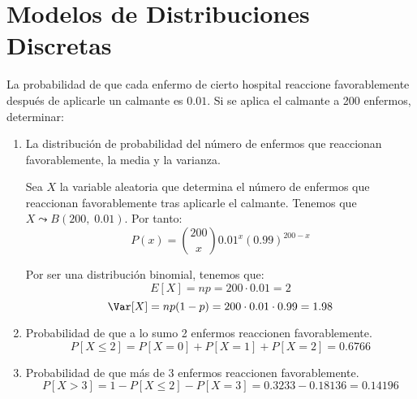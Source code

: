 \section{Modelos de Distribuciones Discretas}



\begin{ejercicio}
    La probabilidad de que cada enfermo de cierto hospital reaccione favorablemente después de aplicarle un calmante es $0.01$. Si se aplica el calmante a 200 enfermos, determinar:
    \begin{enumerate}
        \item La distribución de probabilidad del número de enfermos que reaccionan favorablemente, la media y la varianza.

        Sea $X$ la variable aleatoria que determina el número de enfermos que reaccionan favorablemente tras aplicarle el calmante. Tenemos que $X\leadsto B(200,\;0.01)$. Por tanto:
        \begin{equation*}
            P(x)=\binom{200}{x} 0.01^x (0.99)^{200-x}
        \end{equation*}

        Por ser una distribución binomial, tenemos que:
        \begin{equation*}
            E[X]=np = 200\cdot 0.01=2
        \end{equation*}
        \begin{equation*}
            \Var[X]=np(1-p) = 200\cdot 0.01\cdot 0.99=1.98
        \end{equation*}
        
        \item Probabilidad de que a lo sumo 2 enfermos reaccionen favorablemente.
        \begin{equation*}
            P[X\leq 2]=P[X=0] + P[X=1] + P[X=2] = 0.6766 
        \end{equation*}
        
        \item Probabilidad de que más de 3 enfermos reaccionen favorablemente.
        \begin{equation*}
            P[X>3]=1-P[X\leq 2] -P[X=3] =0.3233 -0.18136=0.14196
        \end{equation*}
    \end{enumerate}
\end{ejercicio}


